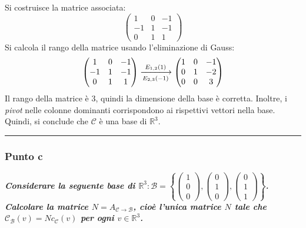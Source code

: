 \documentclass[a4paper]{article}
\newcommand{\longline}{\noindent\rule{\textwidth}{0.4pt}}
\begin{document}
	\noindent
	Si costruisce la matrice associata:
	\begin{equation*}
		\begin{pmatrix}
			1 & 0 & -1 \\
			-1 & 1 & -1 \\
			0 & 1 & 1
		\end{pmatrix}
	\end{equation*}
	Si calcola il rango della matrice usando l'eliminazione di Gauss:
	\begin{equation*}
		\begin{pmatrix}
			1 & 0 & -1 \\
			-1 & 1 & -1 \\
			0 & 1 & 1
		\end{pmatrix}
		\xlongrightarrow[E_{2,3}\left(-1\right)]{E_{1,2}\left(1\right)}
		\begin{pmatrix}
			1 & 0 & -1 \\
			0 & 1 & -2 \\
			0 & 0 & 3
		\end{pmatrix}
	\end{equation*}
	Il rango della matrice è $3$, quindi la dimensione della base è corretta. Inoltre, i \emph{pivot} nelle colonne dominanti corrispondono ai rispettivi vettori nella base. Quindi, si conclude che $\mathcal{C}$ è una base di $\mathbb{R}^{3}$.\newline

	\longline

	\subsubsection{Punto c}

	\textcolor{Green4}{\textbf{\emph{Considerare la seguente base di $\mathbb{R}^{3} : \mathcal{B} = \left\{
		\begin{pmatrix}
			1 \\ 0 \\ 0
		\end{pmatrix},
		\begin{pmatrix}
			0 \\ 1 \\ 0
		\end{pmatrix},
		\begin{pmatrix}
			0 \\ 1 \\ 1
		\end{pmatrix}
	\right\}$. Calcolare la matrice $N=A_{\mathcal{C} \rightarrow \mathcal{B}}$, cioè l'unica matrice $N$ tale che $\mathcal{C}_{\mathcal{B}}\left(v\right) = Nc_{\mathcal{C}}\left(v\right)$ per ogni $v \in \mathbb{R}^{3}$.}}}\newline
	
\end{document}
